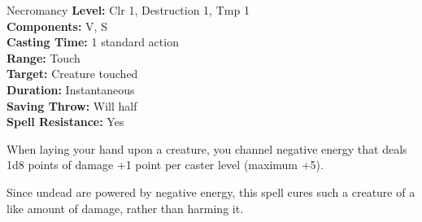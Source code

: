 {Necromancy}
{
	\textbf{Level:}
	Clr 1, Destruction 1, Tmp 1\\
	\textbf{Components:}
	V, S\\
	\textbf{Casting Time:}
	1 standard action\\
	\textbf{Range:}
	Touch\\
	\textbf{Target:}
	Creature touched\\
	\textbf{Duration:}
	Instantaneous\\
	\textbf{Saving Throw:}
	Will half\\
	\textbf{Spell Resistance:}
	Yes\\
}
{
	When laying your hand upon a creature, you channel negative energy that deals 1d8 points of damage +1 point per caster level (maximum +5).

	Since undead are powered by negative energy, this spell cures such a creature of a like amount of damage, rather than harming it.

}
